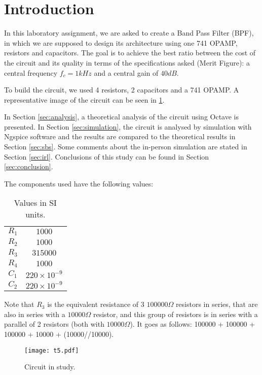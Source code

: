 \section{Introduction}
\label{sec:introduction}

In this laboratory assignment, we are asked to create a Band Pass Filter (BPF), in which we are supposed to design its architecture using one 741 OPAMP, resistors and capacitors. The goal is to achieve the best ratio between the cost of the circuit and its quality in terms of the specifications asked (Merit Figure): a central frequency $f_c=1 kHz$ and a central gain of $40 dB$. \par
To build the circuit, we used 4 resistors, 2 capacitors and a 741 OPAMP. A representative image of the circuit can be seen in \ref{fig:t5}. \par


In Section \ref{sec:analysis}, a theoretical analysis of the circuit using Octave is presented. In Section \ref{sec:simulation}, the circuit is analysed by simulation with Ngspice software and the results are compared to the theoretical results in Section \ref{sec:sbs}. Some comments about the in-person simulation are stated in Section \ref{sec:irl}. Conclusions of this study can be found in Section \ref{sec:conclusion}.

The components used have the following values:
\begin{table}[h]
\centering
\begin{small}
\caption{Values in SI units.}
\begin{tabular}{|c|c|}
\hline
$R_1$ & $1000$ \\
$R_2$ & $1000$\\
$R_3$ & $315000$ \\
$R_4$ & $1000$ \\
$C_1$ & $220\times 10^{-9}$ \\
$C_2$ & $220\times 10^{-9}$ \\
\hline
\end{tabular}
\end{small}
\end{table}
\FloatBarrier

Note that $R_3$ is the equivalent resistance of 3 $100000 \Omega$ resistors in series, that are also in series with a $10000 \Omega$ resistor, and this group of resistors is in series with a parallel of 2 resistors (both with $10000 \Omega$). It goes as follows: 100000 + 100000 + 100000 + 10000 + (10000//10000). 

\begin{figure}[htp] \centering
\texttt{[image: t5.pdf]}
\caption{Circuit in study.}
\label{fig:t5}
\end{figure}
\FloatBarrier

